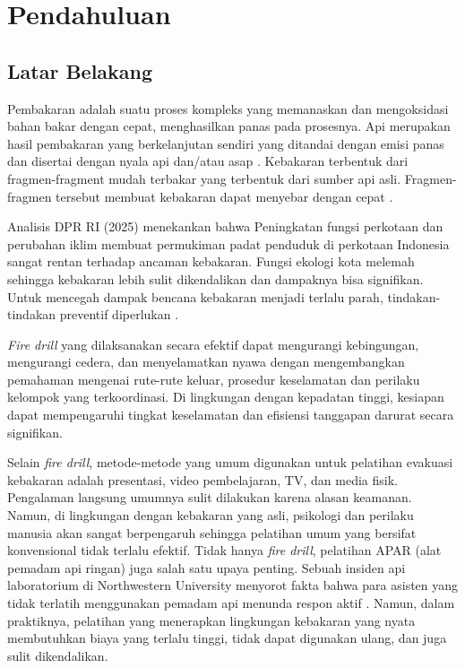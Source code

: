 \chapter{Pendahuluan}

\section{Latar Belakang}
Pembakaran adalah suatu proses kompleks yang memanaskan dan mengoksidasi bahan bakar dengan cepat, menghasilkan panas pada prosesnya. Api merupakan hasil pembakaran yang berkelanjutan sendiri yang ditandai dengan emisi panas dan disertai dengan nyala api dan/atau asap \cite{scott2012wildfire}. Kebakaran terbentuk dari fragmen-fragment mudah terbakar yang terbentuk dari sumber api asli. Fragmen-fragmen tersebut membuat kebakaran dapat menyebar dengan cepat \cite{10.3389/fmech.2022.819633}.

Analisis DPR RI (2025) menekankan bahwa Peningkatan fungsi perkotaan dan perubahan iklim membuat permukiman padat penduduk di perkotaan Indonesia sangat rentan terhadap ancaman kebakaran. Fungsi ekologi kota melemah sehingga kebakaran lebih sulit dikendalikan dan dampaknya bisa signifikan. Untuk mencegah dampak bencana kebakaran menjadi terlalu parah, tindakan-tindakan preventif diperlukan \cite{prihatin2025mitigasi}.

\textit{Fire drill} yang dilaksanakan secara efektif dapat mengurangi kebingungan, mengurangi cedera, dan menyelamatkan nyawa dengan mengembangkan pemahaman mengenai rute-rute keluar, prosedur keselamatan dan perilaku kelompok yang terkoordinasi. Di lingkungan dengan kepadatan tinggi, kesiapan dapat mempengaruhi tingkat keselamatan dan efisiensi tanggapan darurat secara signifikan\cite{michael2024measuring}. 

Selain \textit{fire drill}, metode-metode yang umum digunakan untuk pelatihan evakuasi kebakaran adalah presentasi, video pembelajaran, TV, dan media fisik.  Pengalaman langsung umumnya sulit dilakukan karena alasan keamanan. Namun, di lingkungan dengan kebakaran yang asli, psikologi dan perilaku manusia akan sangat berpengaruh sehingga pelatihan umum yang bersifat konvensional tidak terlalu efektif. Tidak hanya \textit{fire drill}, pelatihan APAR (alat pemadam api ringan) juga salah satu upaya penting. Sebuah insiden api laboratorium di Northwestern University menyorot fakta bahwa para asisten yang tidak terlatih menggunakan pemadam api menunda respon aktif \cite{doi:10.1021/acs.chas.2c00094}. Namun, dalam praktiknya, pelatihan yang menerapkan lingkungan kebakaran yang nyata membutuhkan biaya yang terlalu tinggi, tidak dapat digunakan ulang, dan juga sulit dikendalikan\cite{9824639}. 


